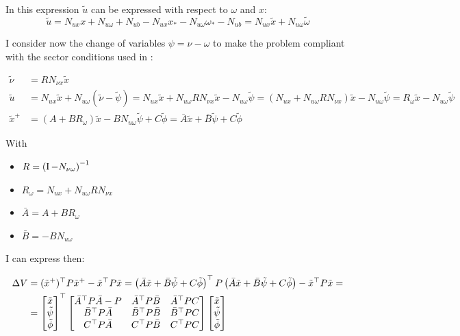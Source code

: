 \documentclass{article}
\begin{document}
In this expression $\tilde{u}$ can be expressed with respect to $\omega$ and $x$:
$$
  \tilde{u} = N_{ux} x + N_{u \omega} + N_{ub} - N_{ux} x_* - N_{u \omega} \omega_* - N_{ub} = N_{ux} \tilde{x} + N_{u \omega} \tilde{\omega}
$$

I consider now the change of variables $\psi = \nu - \omega$ to make the problem compliant with the sector conditions used in \cite{css-extended}:

\begin{align*}
  \tilde{\nu} &= R N_{\nu x} \tilde{x} \\
  \tilde{u} &= N_{ux} \tilde{x} + N_{u \omega} (\tilde{\nu} - \tilde{\psi}) = N_{ux} \tilde{x} + N_{u \omega} R N_{\nu x} \tilde{x} - N_{u \omega} \tilde{\psi} = (N_{ux} + N_{u \omega} R N_{\nu x}) \tilde{x} - N_{u \omega} \tilde{\psi} = R_{\omega} \tilde{x} - N_{u \omega} \tilde{\psi} \\
  \tilde{x}^{+} &= (A + B R_{\omega}) \tilde{x} - B N_{u \omega} \tilde{\psi} + C \tilde{\phi} = \bar{A} \tilde{x} + \bar{B} \tilde{\psi} + C \tilde{\phi}
\end{align*}

With \begin{itemize}
  \item $R = \left( \operatorname{I} - N_{\nu \omega} \right)^{-1}$
  \item $R_{\omega} = N_{ux} + N_{u \omega} R N_{\nu x}$
  \item $\bar{A} = A + B R_{\omega}$
  \item $\bar{B} = - B N_{u \omega}$
\end{itemize}

I can express then:

\begin{align*}
  \Delta V &= (\tilde{x}^{+})^\top P \tilde{x}^{+} - \tilde{x}^\top P \tilde{x} = \left( \bar{A} \tilde{x} + \bar{B} \tilde{\psi} + C \tilde{\phi} \right)^\top P \left( \bar{A} \tilde{x} + \bar{B} \tilde{\psi} + C \tilde{\phi} \right) - \tilde{x}^\top P \tilde{x} = \\
  &= \left[\begin{matrix}
    \tilde{x}\\
    \tilde{\psi}\\
    \tilde{\phi}
  \end{matrix}\right]^\top \left[\begin{matrix}
    \bar{A}^\top P \bar{A} - P & \bar{A}^\top P \bar{B} & \bar{A}^\top P C \\
    \bar{B}^\top P \bar{A} & \bar{B}^\top P \bar{B} & \bar{B}^\top P C \\
    C^\top P \bar{A} & C^\top P \bar{B} & C^\top P C
  \end{matrix}\right] \left[\begin{matrix}
    \tilde{x}\\
    \tilde{\psi}\\
    \tilde{\phi}
  \end{matrix}\right]
\end{align*}
\end{document}
